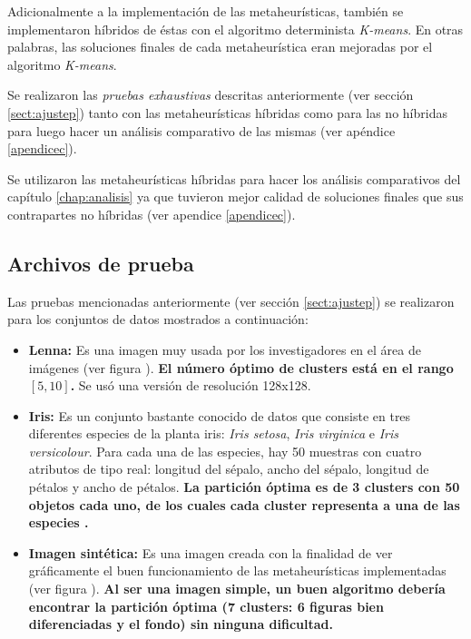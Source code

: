     Adicionalmente a la implementación de las metaheurísticas, también se implementaron
híbridos de éstas con el algoritmo determinista \emph{K-means}. En otras palabras,
las soluciones finales de cada metaheurística eran mejoradas por el algoritmo
\emph{K-means}.

    Se realizaron las \emph{pruebas exhaustivas} descritas anteriormente (ver
sección \ref{sect:ajustep}) tanto con las metaheurísticas híbridas como para las
no híbridas para luego hacer un análisis comparativo de las mismas (ver apéndice
\ref{apendicec}).

    Se utilizaron las metaheurísticas híbridas para hacer los análisis comparativos
del capítulo \ref{chap:analisis} ya que tuvieron mejor calidad de soluciones
finales que sus contrapartes no híbridas (ver apendice \ref{apendicec}).

\subsection{Archivos de prueba}\label{datatest}

    Las pruebas mencionadas anteriormente (ver sección \ref{sect:ajustep}) se
realizaron para los conjuntos de datos mostrados a continuación:
\begin{itemize}

\item {\bf Lenna:}\label{test:lenna} Es una imagen muy usada por los investigadores en el área 
de imágenes (ver figura
). 
\textbf{El número óptimo de clusters está en el rango $[5,10]$\cite{OuBa2007}.}
Se usó una versión de resolución 128x128.

\item {\bf Iris:}\label{test:iris} Es un conjunto bastante conocido de datos que
consiste en tres diferentes especies de la planta iris: \emph{Iris setosa},
\emph{Iris virginica} e \emph{Iris versicolour}. Para cada una de las especies,
hay 50 muestras con cuatro atributos de tipo real: longitud del sépalo, ancho
del sépalo, longitud de pétalos y ancho de pétalos. \textbf{La partición óptima
es de 3 clusters con 50 objetos cada uno, de los cuales cada cluster representa a
una de las especies \cite{SwAjAm2008}.}

\item {\bf Imagen sintética:} Es una imagen creada con la finalidad de ver
gráficamente el buen funcionamiento
de las metaheurísticas implementadas (ver figura ). \textbf{Al
ser una imagen simple, un buen
algoritmo debería encontrar la partición óptima (7 clusters: 6 figuras bien
diferenciadas y el fondo) sin ninguna dificultad.}

\end{itemize}


